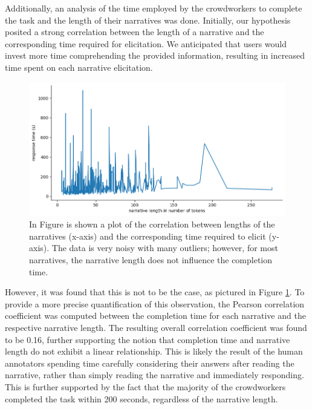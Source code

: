 Additionally, an analysis of the time employed by the crowdworkers to complete the task and the length of their narratives was done. Initially, our hypothesis posited a strong correlation between the length of a narrative and the corresponding time required for elicitation. We anticipated that users would invest more time comprehending the provided information, resulting in increased time spent on each narrative elicitation.
\begin{figure}[!htbp]
    \centering
    \includegraphics[width=1\linewidth]{assets//imgs/dataset-pearson-correlation.png}
    \caption{In Figure is shown a plot of the correlation between lengths of the narratives (x-axis) and the corresponding time required to elicit (y-axis). The data is very noisy with many outliers; however, for most narratives, the narrative length does not influence the completion time.}
    \label{fig:dataset-pearson-correlation}
\end{figure}
However, it was found that this is not to be the case, as pictured in Figure \ref{fig:dataset-pearson-correlation}. To provide a more precise quantification of this observation, the Pearson correlation coefficient \cite{pearson} was computed between the completion time for each narrative and the respective narrative length. The resulting overall correlation coefficient was found to be 0.16, further supporting the notion that completion time and narrative length do not exhibit a linear relationship. This is likely the result of the human annotators spending time carefully considering their answers after reading the narrative, rather than simply reading the narrative and immediately responding. This is further supported by the fact that the majority of the crowdworkers completed the task within 200 seconds, regardless of the narrative length.

